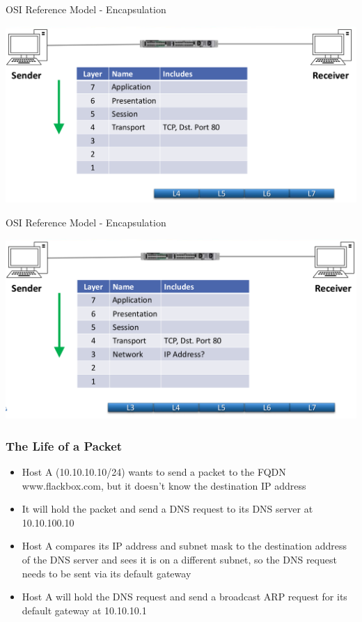 \documentclass[pdflatex,compress,mathserif]{beamer}
\begin{document}
\begin{frame}{OSI Reference Model - Encapsulation}
	\begin{center}
		\includegraphics[width=\linewidth]{img/img15}
	\end{center}
\end{frame}


\begin{frame}{OSI Reference Model - Encapsulation}
	\begin{center}
		\includegraphics[width=\linewidth]{img/img16}
	\end{center}
\end{frame}

\begin{frame}
	\frametitle{The Life of a Packet}
	\begin{itemize}
		\item Host A (10.10.10.10/24) wants to send a packet to the FQDN www.flackbox.com, but it doesn’t know the destination IP address
		\item It will hold the packet and send a DNS request to its DNS server at 10.10.100.10
		\item Host A compares its IP address and subnet mask to the destination address of the DNS server and sees it is on a different subnet, so the DNS request needs to be sent via its default gateway
		\item Host A will hold the DNS request and send a broadcast ARP request for its default gateway at 10.10.10.1
	\end{itemize}
\end{frame}
\end{document}
